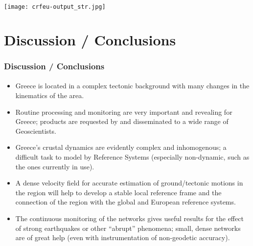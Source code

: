 \begin{frame}
  \frametitle{}
  \framesubtitle{}
  \label{}

\begin{center}
  \texttt{[image: crfeu-output\_str.jpg]}
\end{center}

\end{frame}
\note{}





\section{Discussion / Conclusions}
\begin{frame}
  \frametitle{Discussion / Conclusions}
  \framesubtitle{}
  \label{}
  \begin{itemize}\setlength\itemsep{1em}
    \item Greece is located in a complex tectonic background with many changes in the kinematics of the area.
    
    \item Routine processing and monitoring are very important and revealing for 
      Greece; products are requested by and disseminated to a wide range of Geoscientists.

    \item Greece's crustal dynamics are evidently complex and inhomogenous; a difficult 
      task to model by Reference Systems (especially non-dynamic, such as the ones 
      currently in use).

    \item A dense velocity field for accurate estimation of ground/tectonic motions in the region will help to develop a stable local reference frame and the connection of the region with the global and European reference systems.
    
    \item The continuous monitoring of the networks gives useful results for the effect of strong earthquakes or other ``abrupt'' phenomena; small, dense networks 
      are of great help (even with instrumentation of non-geodetic accuracy).
  \end{itemize}
\end{frame}
\note{}

